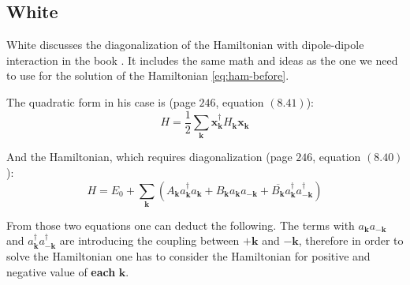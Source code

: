 \documentclass[a4paper,12pt]{article}
\begin{document}
        \subsection{White}
            White discusses the diagonalization of the Hamiltonian with dipole-dipole interaction in the book \cite{white1983quantum}. 
            It includes the same math and ideas as the one we need to use for the solution of the Hamiltonian \eqref{eq:ham-before}.

            The quadratic form in his case is (page $246$, equation $(8.41)$):
            \begin{equation}
                H = \dfrac{1}{2} \sum_{\boldsymbol{k}} \boldsymbol{x}^{\dag}_{\boldsymbol{k}} H_{\boldsymbol{k}} \boldsymbol{x}_{\boldsymbol{k}}
            \end{equation}

            And the Hamiltonian, which requires diagonalization (page $246$, equation $(8.40)$):
            \begin{equation}
                H = E_0 + \sum_{\boldsymbol{k}} \left(A_{\boldsymbol{k}}a^{\dag}_{\boldsymbol{k}}a_{\boldsymbol{k}} + 
                B_{\boldsymbol{k}}a_{\boldsymbol{k}}a_{-\boldsymbol{k}} + 
                \overline{B_{\boldsymbol{k}}}a^{\dag}_{\boldsymbol{k}}a^{\dag}_{-\boldsymbol{k}}\right)
            \end{equation}

            From those two equations one can deduct the following. The terms with $a_{\boldsymbol{k}}a_{-\boldsymbol{k}}$ 
            and $a^{\dag}_{\boldsymbol{k}}a^{\dag}_{-\boldsymbol{k}}$ are introducing the coupling between $+\boldsymbol{k}$ and $-\boldsymbol{k}$,
            therefore in order to solve the Hamiltonian one has to consider the Hamiltonian for positive and negative value of \textbf{each} $\boldsymbol{k}$.












   
   
\end{document}
